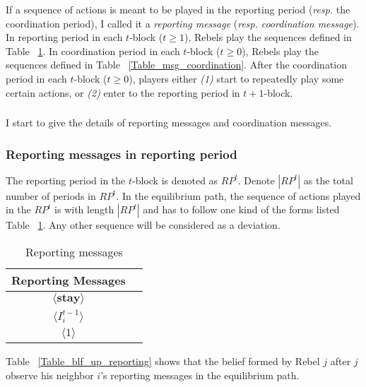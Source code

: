 \documentclass[12pt,letter]{article}
\theoremstyle{definition}
\theoremstyle{remark}
\theoremstyle{claim}
\begin{document}
If a sequence of actions is meant to be played in the reporting period (\textit{resp.} the coordination period), I called it a \textit{reporting message} (\textit{resp.} \textit{coordination message}). In reporting period in each $t$-block ($t\geq 1$), Rebels play the sequences defined in Table ~\ref{Table_msg_reporting}. In coordination period in each $t$-block ($t\geq 0$), Rebels play the sequences defined in Table ~\ref{Table_msg_coordination}. After the coordination period in each $t$-block ($t\geq 0$), players either \textit{(1)} start to repeatedly play some certain actions,  or \textit{(2)} enter to the reporting period in $t+1$-block. 


\subsubsection*{}
I start to give the details of reporting messages and coordination messages.


\subsubsection{Reporting messages in reporting period}

The reporting period in the $t$-block is denoted as $RP^t$. Denote $| RP^t |$ as the total number of periods in $RP^t$. In the equilibrium path, the sequence of actions played in the $RP^t$ is with length $| RP^t |$ and has to follow one kind of the forms listed Table ~\ref{Table_msg_reporting}. Any other sequence will be considered as a deviation. 

\begin{table}[ht]
\caption{Reporting messages}
\label{Table_msg_reporting}
\begin{center}
\begin{tabular}{c c }
Reporting Messages 		&   \\
\hline
$\langle  \textbf{stay} \rangle$ 	& 	 \\
$\langle  {I^{t-1}_i} \rangle$ 		&   \\
$\langle 1 \rangle$ 		             &    
\end{tabular}
\end{center}
\end{table}

Table ~\ref{Table_blf_up_reporting} shows that the belief formed by Rebel $j$ after $j$ observe his neighbor $i$'s reporting messages in the equilibrium path.
\end{document}
